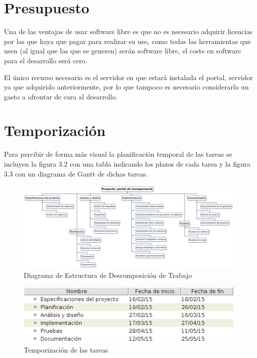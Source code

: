 \section{Presupuesto}

Una de las ventajas de usar software libre es que no es necesario adquirir licencias por las que haya que pagar para realizar su uso, como todas las herramientas que usen (al igual que las que se generen) serán software libre, el coste en software para el desarrollo será cero.

\bigskip

El único recurso necesario es el servidor en que estará instalada el portal, servidor ya que adquirido anteriormente, por lo que tampoco es necesario considerarlo un gasto a afrontar de cara al desarrollo.

\section{Temporización}

Para percibir de forma más visual la planificación temporal de las tareas se incluyen la figura 3.2 con una tabla indicando los plazos de cada tarea y la figura 3.3 con un diagrama de Gantt de dichas tareas.
\newpage

\begin{figure}[!ht]
  \begin{center}
    \includegraphics[scale=0.25,angle=90]{imagenes/diagrama_edt.png}
    \caption{Diagrama de Estructura de Descomposición de Trabajo}
    \label{fig:diag_edt}
  \end{center}
\end{figure}

\newpage
\begin{figure}[!ht]
  \begin{center}
    \includegraphics[width=1\textwidth]{imagenes/tempo_tareas.png}
    \caption{Temporización de las tareas}
    \label{fig:tempo_tareas}
  \end{center}
\end{figure}

